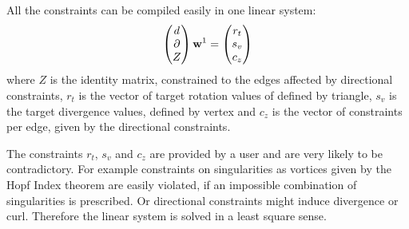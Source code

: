 All the constraints can be compiled easily in one linear system:
\begin{equation}\begin{pmatrix} d \\
\partial \\
Z
\end{pmatrix} \textbf{w}^1
= \begin{pmatrix}
r_t \\
s_v \\
c_z
\end{pmatrix} \label{eq:vfdesign1}
\end{equation}
where $Z$ is the identity matrix, constrained to the edges  affected by directional constraints, $r_t$ is the vector of target rotation values of defined by triangle, $s_v$ is the  target divergence values, defined by vertex and $c_z$ is the vector of constraints per edge, given by the directional constraints.

The constraints $r_t$, $s_v$ and $c_z$ are provided by a user and are very likely to be contradictory. For example constraints on singularities as vortices given by the Hopf Index theorem are easily violated, if an impossible combination of singularities is prescribed. Or directional constraints might induce divergence or curl. Therefore the linear system is solved in a least square sense.

